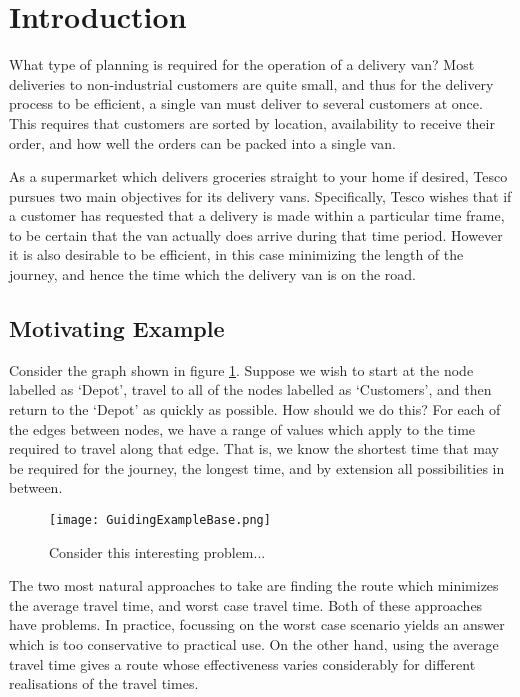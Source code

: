 \section{Introduction}
What type of planning is required for the operation of a delivery van? Most deliveries to non-industrial customers are quite small, and thus for the delivery process to be efficient, a single van must deliver to several customers at once. This requires that customers are sorted by location, availability to receive their order, and how well the orders can be packed into a single van.

As a supermarket which delivers groceries straight to your home if desired, Tesco pursues two main objectives for its delivery vans. Specifically, Tesco wishes that if a customer has requested that a delivery is made within a particular time frame, to be certain that the van actually does arrive during that time period. However it is also desirable to be efficient, in this case minimizing the length of the journey, and hence the time which the delivery van is on the road.


\subsection{Motivating Example}
Consider the graph shown in figure \ref{fig:guiding_example}. Suppose we wish to start at the node labelled as `Depot', travel to all of the nodes labelled as `Customers', and then return to the `Depot' as quickly as possible. How should we do this? For each of the edges between nodes, we have a range of values which apply to the time required to travel along that edge. That is, we know the shortest time that may be required for the journey, the longest time, and by extension all possibilities in between.

\begin{figure}[h!]
	\centering
	\texttt{[image: GuidingExampleBase.png]}
	\caption{Consider this interesting problem...}
	\label{fig:guiding_example}
\end{figure}

The two most natural approaches to take are finding the route which minimizes the average travel time, and worst case travel time. Both of these approaches have problems. In practice, focussing on the worst case scenario yields an answer which is too conservative to practical use. On the other hand, using the average travel time gives a route whose effectiveness varies considerably for different realisations of the travel times. 

